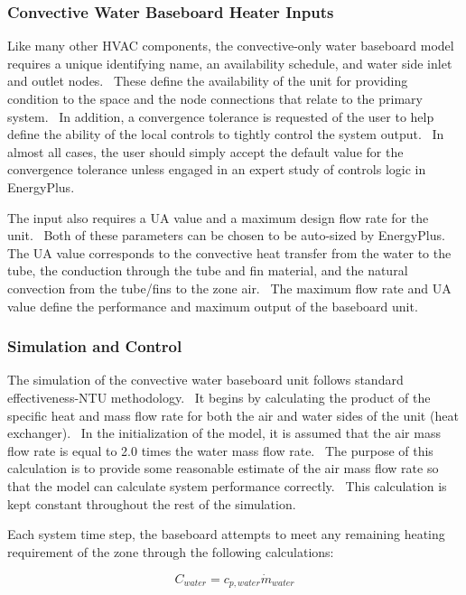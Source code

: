 \subsubsection{Convective Water Baseboard Heater Inputs}\label{convective-water-baseboard-heater-inputs}

Like many other HVAC components, the convective-only water baseboard model requires a unique identifying name, an availability schedule, and water side inlet and outlet nodes.~ These define the availability of the unit for providing condition to the space and the node connections that relate to the primary system.~ In addition, a convergence tolerance is requested of the user to help define the ability of the local controls to tightly control the system output.~ In almost all cases, the user should simply accept the default value for the convergence tolerance unless engaged in an expert study of controls logic in EnergyPlus.

The input also requires a UA value and a maximum design flow rate for the unit.~ Both of these parameters can be chosen to be auto-sized by EnergyPlus.~ The UA value corresponds to the convective heat transfer from the water to the tube, the conduction through the tube and fin material, and the natural convection from the tube/fins to the zone air.~ The maximum flow rate and UA value define the performance and maximum output of the baseboard unit.

\subsubsection{Simulation and Control}\label{simulation-and-control-000}

The simulation of the convective water baseboard unit follows standard effectiveness-NTU methodology.~ It begins by calculating the product of the specific heat and mass flow rate for both the air and water sides of the unit (heat exchanger).~ In the initialization of the model, it is assumed that the air mass flow rate is equal to 2.0 times the water mass flow rate.~ The purpose of this calculation is to provide some reasonable estimate of the air mass flow rate so that the model can calculate system performance correctly.~ This calculation is kept constant throughout the rest of the simulation.

Each system time step, the baseboard attempts to meet any remaining heating requirement of the zone through the following calculations:

\begin{equation}
{C_{water}} = {c_{p,water}}{\dot m_{water}}
\end{equation}


